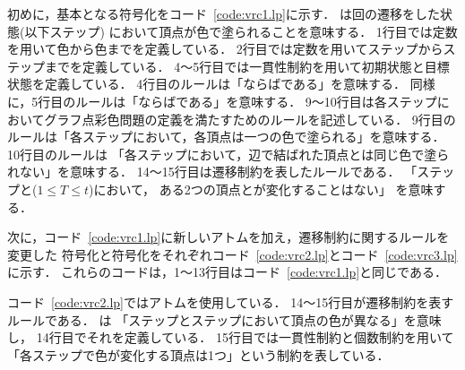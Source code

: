 初めに，基本となる符号化をコード~\ref{code:vrc1.lp}に示す．
は回の遷移をした状態(以下ステップ)
において頂点が色で塗られることを意味する．
1行目では定数を用いて色から色までを定義している．
2行目では定数を用いてステップからステップまでを定義している．
4～5行目では一貫性制約を用いて初期状態と目標状態を定義している．
4行目のルールは「ならばである」を意味する．
同様に，5行目のルールは「ならばである」を意味する．
9～10行目は各ステップにおいてグラフ点彩色問題の定義を満たすためのルールを記述している．
9行目のルールは「各ステップにおいて，各頂点は一つの色で塗られる」を意味する．
10行目のルールは
「各ステップにおいて，辺で結ばれた頂点とは同じ色で塗られない」を意味する．
14～15行目は遷移制約を表したルールである．
「ステップと($1 \leq T \leq t$)において，
ある2つの頂点とが変化することはない」
を意味する．



次に，コード~\ref{code:vrc1.lp}に新しいアトムを加え，遷移制約に関するルールを変更した
符号化と符号化をそれぞれコード~\ref{code:vrc2.lp}とコード~\ref{code:vrc3.lp}に示す．
これらのコードは，1～13行目はコード~\ref{code:vrc1.lp}と同じである．





コード~\ref{code:vrc2.lp}ではアトムを使用している．
14～15行目が遷移制約を表すルールである．
は
「ステップとステップにおいて頂点の色が異なる」を意味し，
14行目でそれを定義している．
15行目では一貫性制約と個数制約を用いて
「各ステップで色が変化する頂点は1つ」という制約を表している．

